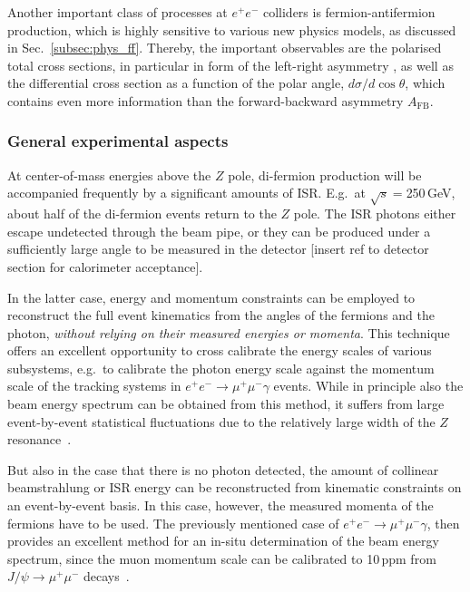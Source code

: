 Another important class of processes at $e^+e^-$ colliders is fermion-antifermion production, which is highly sensitive to various new physics models, as discussed in Sec.~\ref{subsec:phys_ff}. Thereby, the important observables are the polarised total cross sections, in particular in form of the left-right asymmetry \ALR, as well as the differential cross section as a function of the polar angle, $d\sigma/d \cos{\theta}$, which contains even more information than the forward-backward asymmetry $A_{\mathrm{FB}}$.

\subsubsection{General experimental aspects}

At center-of-mass energies above the $Z$ pole, di-fermion production will be accompanied frequently by a significant amounts of ISR. E.g.\ at $\sqrt{s}=$250\,GeV, about half of the di-fermion events return to the $Z$ pole. The ISR photons either escape undetected through the beam pipe, or they can be produced under a sufficiently large angle to be measured in the detector {\color{red} [insert ref to detector section for calorimeter acceptance]}.

In the latter case, energy and momentum constraints can be employed to reconstruct the full event kinematics from the angles of the fermions and the photon, {\em without relying on their measured energies or momenta}. This technique offers an excellent opportunity to cross calibrate the energy scales of various subsystems, e.g.\ to calibrate the photon energy scale against the momentum scale of the tracking systems in $e^+e^- \to \mu^+\mu^-\gamma $ events. While in principle also the beam energy spectrum can be obtained from this method, it suffers from large event-by-event statistical fluctuations due to the relatively large width of the $Z$ resonance~\cite{Wilson:2016hne}.

But also in the case that there is no photon detected, the amount of collinear beamstrahlung or ISR energy can be reconstructed from kinematic constraints on an event-by-event basis. In this case, however, the measured momenta of the fermions have to be used. The previously mentioned case of $e^+e^- \to \mu^+\mu^-\gamma $, then provides an excellent method for an in-situ determination of the beam energy spectrum, since the muon momentum scale can be calibrated to 10\,ppm from $J/\psi \to \mu^+\mu^-$ decays~\cite{Wilson:2016hne}.

